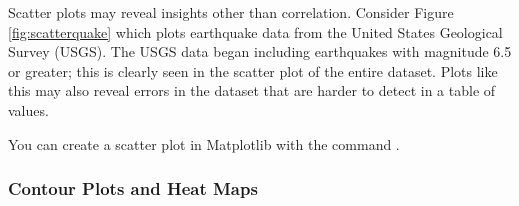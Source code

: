 Scatter plots may reveal insights other than correlation.
Consider Figure \ref{fig:scatterquake} which plots earthquake data from the United States Geological Survey (USGS).
The USGS data began including earthquakes with magnitude 6.5 or greater; this is clearly seen 
in the scatter plot of the entire dataset.
Plots like this may also reveal errors in the dataset that are harder to detect in a table of values.
 
You can create a scatter plot in Matplotlib with the command .

\newpage

\subsubsection*{Contour Plots and Heat Maps} %

